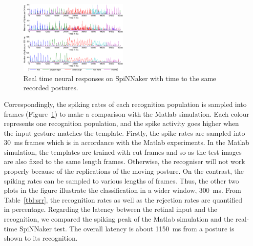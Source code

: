 \documentclass[journal]{journal}
\begin{document}
\begin{figure}
\centering
	\includegraphics[width=0.48\textwidth]{pics/rateSpiNN.pdf}
	\caption{Real time neural responses on SpiNNaker with time to the same recorded postures.}
	\label{fig:spikerec}
\end{figure}

Correspondingly, the spiking rates of each recognition population is sampled into frames (Figure~\ref{fig:spikerec}) to make a comparison with the Matlab simulation. 
Each colour represents one recognition population, and the spike activity goes higher when the input 
gesture matches the template. 
Firstly, the spike rates are sampled into 30~ms frames which is in accordance with the Matlab experiments.
In the Matlab simulation, the templates are trained with cut frames and so as the test images are also fixed to the same length frames.
Otherwise, the recogniser will not work properly because of the replications of the moving posture.
On the contrast, the spiking rates can be sampled to various lengths of frames.
Thus, the other two plots in the figure illustrate the classification in a wider window, 300~ms.
From Table~\ref{tbl:srr}, the recognition rates as well as the rejection rates are quantified in percentage.
Regarding the latency between the retinal input and the recognition, we compared the spiking peak of the Matlab simulation and the real-time SpiNNaker test.
The overall latency is about 1150~ms from a posture is shown to its recognition. 
\end{document}
